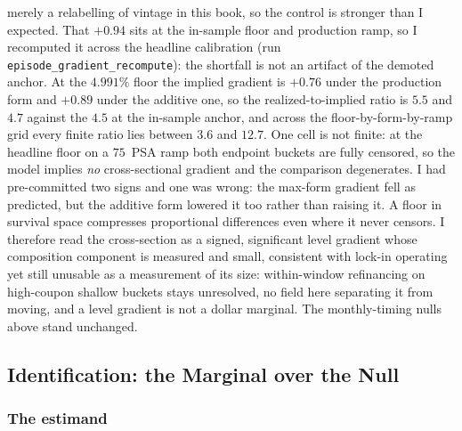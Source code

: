\documentclass[12pt]{article}
\begin{document}
merely a relabelling of vintage in this book, so the control is stronger than I expected. That $+0.94$ sits at the in-sample floor and production ramp, so I recomputed it across the headline calibration (run \texttt{episode\_gradient\_recompute}): the shortfall is not an artifact of the demoted anchor. At the $4.991\%$ floor the implied gradient is $+0.76$ under the production form and $+0.89$ under the additive one, so the realized-to-implied ratio is $5.5$ and $4.7$ against the $4.5$ at the in-sample anchor, and across the floor-by-form-by-ramp grid every finite ratio lies between $3.6$ and $12.7$. One cell is not finite: at the headline floor on a $75$~PSA ramp both endpoint buckets are fully censored, so the model implies \emph{no} cross-sectional gradient and the comparison degenerates. I had pre-committed two signs and one was wrong: the max-form gradient fell as predicted, but the additive form lowered it too rather than raising it. A floor in survival space compresses proportional differences even where it never censors. I therefore read the cross-section as a signed, significant level gradient whose composition component is measured and small, consistent with lock-in operating yet still unusable as a measurement of its size: within-window refinancing on high-coupon shallow buckets stays unresolved, no field here separating it from moving, and a level gradient is not a dollar marginal. The monthly-timing nulls above stand unchanged.
\subsection{Identification: the Marginal over the Null}\label{sec:identification}

\subsubsection{The estimand}
\end{document}
